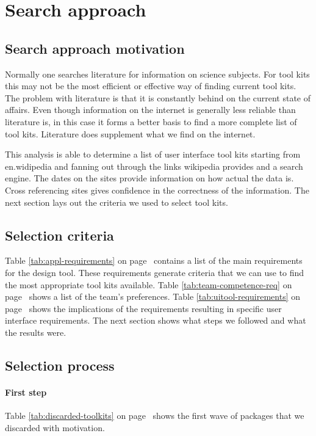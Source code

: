 \section{Search approach}

\subsection{Search approach motivation}

Normally one searches literature for information on science subjects.  For tool
kits this may not be the most efficient or effective way of finding current
tool kits. The problem with literature is that it is constantly behind on the
current state of affairs. Even though information on the internet is generally
less reliable than literature is, in this case it forms a better basis to find
a more complete list of tool kits. Literature does supplement what we find on
the internet.

This analysis is able to determine a list of user interface tool kits starting
from en.widipedia and fanning out through the links wikipedia provides and a
search engine. The dates on the sites provide information on how actual the
data is. Cross referencing sites gives confidence in the correctness of the
information. The next section lays out the criteria we used to select tool
kits.

\subsection{Selection criteria}

Table \ref{tab:appl-requirements} on page~\pageref{tab:appl-requirements}
contains a list of the main requirements for the design tool. These
requirements generate criteria that we can use to find the most appropriate
tool kits available.  Table \ref{tab:team-competence-req} on
page~\pageref{tab:team-competence-req} shows a list of the team's preferences.
Table \ref{tab:uitool-requirements} on page~\pageref{tab:uitool-requirements}
shows the implications of the requirements resulting in specific user interface
requirements. The next section shows what steps we followed and what the
results were.

\subsection{Selection process}

\paragraph{First step} Table \ref{tab:discarded-toolkits} on
page~\pageref{tab:discarded-toolkits} shows the first wave of packages that we
discarded with motivation. 

